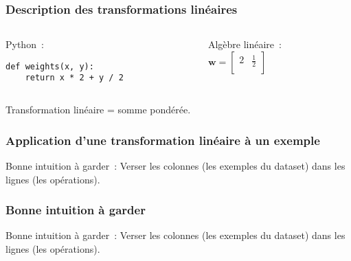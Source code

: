 \documentclass{formation}
\begin{document}
\begin{frame}[fragile]
  \frametitle{Description des transformations linéaires}
  \begin{columns}
    \begin{column}{0.5\textwidth}
      Python :
\begin{verbatim}
def weights(x, y):
    return x * 2 + y / 2
\end{verbatim}
    \end{column}
    \begin{column}{0.5\textwidth}
      Algèbre linéaire : \\[.3cm]

      \(
      \mathbf{w} = \begin{bmatrix}
        2 & \frac{1}{2} \\
      \end{bmatrix}
      \)
    \end{column}
  \end{columns}
  \vfill
  Transformation linéaire = somme pondérée.
\end{frame}

\begin{frame}
  \frametitle{Application d'une transformation linéaire à un exemple}


  Bonne intuition à garder : Verser les colonnes (les exemples du
  dataset) dans les lignes (les opérations).
\end{frame}

\begin{frame}
  \frametitle{Bonne intuition à garder}

  Bonne intuition à garder : Verser les colonnes (les exemples du
  dataset) dans les lignes (les opérations).
\end{frame}
\end{document}
